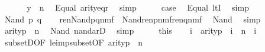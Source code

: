 \begin{isabellebody}
\ \ \isamarkupfalse%
\isanewline
\ \ \isamarkupfalse%
\ {\isachardoublequoteopen}y\ {\isasymin}\ n{\isachardoublequoteclose}\ \isamarkupfalse%
\ Equal\ arity{\isacharunderscore}{\kern0pt}eqr\ \isamarkupfalse%
\ simp\isanewline
\ \ \isamarkupfalse%
\ \isamarkupfalse%
\ {\isacharquery}{\kern0pt}case\ \isamarkupfalse%
\ Equal\ ltI\ \isamarkupfalse%
\ simp\isanewline
{}\isamarkupfalse%
\isanewline
\ \ \isamarkupfalse%
\ {\isacharparenleft}{\kern0pt}Nand\ p\ q{\isacharparenright}{\kern0pt}\isanewline
\ \ \isamarkupfalse%
\ {\isachardoublequoteopen}ren{\isacharparenleft}{\kern0pt}Nand{\isacharparenleft}{\kern0pt}p{\isacharcomma}{\kern0pt}q{\isacharparenright}{\kern0pt}{\isacharparenright}{\kern0pt}{\isacharbackquote}{\kern0pt}n{\isacharbackquote}{\kern0pt}m{\isacharbackquote}{\kern0pt}f\ {\isacharequal}{\kern0pt}\ Nand{\isacharparenleft}{\kern0pt}ren{\isacharparenleft}{\kern0pt}p{\isacharparenright}{\kern0pt}{\isacharbackquote}{\kern0pt}n{\isacharbackquote}{\kern0pt}m{\isacharbackquote}{\kern0pt}f{\isacharcomma}{\kern0pt}ren{\isacharparenleft}{\kern0pt}q{\isacharparenright}{\kern0pt}{\isacharbackquote}{\kern0pt}n{\isacharbackquote}{\kern0pt}m{\isacharbackquote}{\kern0pt}f{\isacharparenright}{\kern0pt}{\isachardoublequoteclose}\ \isamarkupfalse%
\ Nand\ \isamarkupfalse%
\ simp\isanewline
\ \ \isamarkupfalse%
\isanewline
\ \ \isamarkupfalse%
\ {\isachardoublequoteopen}arity{\isacharparenleft}{\kern0pt}p{\isacharparenright}{\kern0pt}\ {\isasymle}\ n{\isachardoublequoteclose}\ \isamarkupfalse%
\ Nand\ nand{\isacharunderscore}{\kern0pt}ar{}D\ \isamarkupfalse%
\ simp\isanewline
\ \ \isamarkupfalse%
\ \isamarkupfalse%
\ this\isanewline
\ \ \isamarkupfalse%
\ {\isachardoublequoteopen}i\ {\isasymin}\ arity{\isacharparenleft}{\kern0pt}p{\isacharparenright}{\kern0pt}\ {\isasymLongrightarrow}\ i\ {\isasymin}\ n{\isachardoublequoteclose}\ \ i\ \isamarkupfalse%
\ subsetD{\isacharbrackleft}{\kern0pt}OF\ le{\isacharunderscore}{\kern0pt}imp{\isacharunderscore}{\kern0pt}subset{\isacharbrackleft}{\kern0pt}OF\ {\isacartoucheopen}arity{\isacharparenleft}{\kern0pt}p{\isacharparenright}{\kern0pt}\ {\isasymle}\ n{\isacartoucheclose}{\isacharbrackright}{\kern0pt}{\isacharbrackright}{\kern0pt}\ \isamarkupfalse%

\end{isabellebody}

